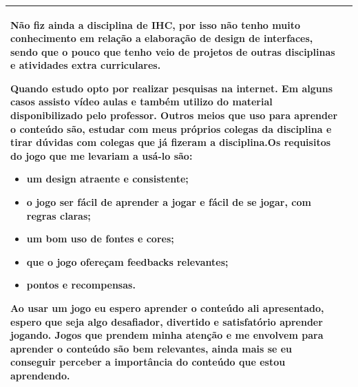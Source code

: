 \begin{table}[htbp]
\begin{tabular}{| m{} m{}|}
{        Não fiz ainda a disciplina de IHC, por isso não tenho muito conhecimento em relação a elaboração de design de interfaces, sendo que o pouco que tenho veio de projetos de outras disciplinas e atividades extra curriculares.
        
        Quando estudo opto por realizar pesquisas na internet. Em alguns casos assisto vídeo aulas e também  utilizo do material disponibilizado pelo professor. Outros meios que uso para aprender o conteúdo são, estudar com meus próprios colegas da disciplina e tirar dúvidas com colegas que já fizeram a disciplina.Os requisitos do jogo que me levariam a usá-lo são: 
        
        \begin{itemize}
            \item um design atraente e consistente; 
            \item o jogo ser fácil de aprender a jogar e fácil de se jogar, com regras claras; 
            \item um bom uso de fontes e cores; 
            \item que o jogo ofereçam feedbacks relevantes;
            \item pontos e recompensas.
        \end{itemize}
        
        Ao usar um jogo eu espero aprender o conteúdo ali apresentado, espero que seja algo desafiador, divertido e satisfatório aprender jogando. Jogos que prendem minha atenção e me envolvem para  aprender o conteúdo são bem relevantes, ainda mais se eu conseguir perceber a importância do conteúdo que estou aprendendo. 
        } \\ \hline
\end{tabular}
\end{table}